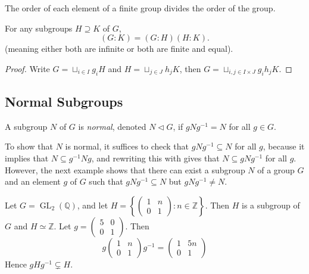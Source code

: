 \begin{corollary}
  \label{corollary-element-order-divide-group-order}
  The order of each element of a finite group divides the order of the group.
\end{corollary}

\begin{proposition}
  \label{proposition-generalization-Lagrange}
  For any subgroups \( H \supseteq K \) of \( G \), 
  \[
    (G: K) = (G: H)(H: K).
  \]
  (meaning either both are infinite or both are finite and equal).
\end{proposition}
\begin{proof}
  Write \( G = \sqcup_{i \in I} g_i H \) and \( H = \sqcup_{j \in J} h_jK \), then \( G = \sqcup_{i, j \in I \times J} g_i h_j K \).
\end{proof}

\subsection{Normal Subgroups}
\label{subsection-normal-subgroups}


\begin{definition}
  \label{definition-normal-subgroup}
  A subgroup \( N \) of \( G \) is \emph{normal}, denoted \( N \triangleleft G \), if \( gNg^{-1} = N \) for all \( g \in G \).
\end{definition}

\begin{remark}
  \label{remark-verify-subgroup-normal}
  To show that \( N \) is normal, it suffices to check that \( g N g^{-1} \subseteq N \) for all \( g \), because it implies that \( N \subseteq g^{-1} N g \), and rewriting this with gives that \( N \subseteq g N g^{-1} \) for all \( g \).
  However, the next example shows that there can exist a subgroup \( N \) of a group \( G \) and an element \( g \) of \( G \) such that \( g N g^{-1} \subseteq N \) but \( g N g^{-1} \neq N \).
\end{remark}

\begin{example}
  \label{example-conjugated-subgroup-contained-but-not-equal}
  Let \( G = \operatorname{GL}_2(\mathbb{Q}) \), and let \( H = \left\lbrace \begin{pmatrix}
      1 &n\\0 &1
  \end{pmatrix}: n \in \mathbb{Z} \right\rbrace \).
  Then \( H \) is a subgroup of \( G \) and \( H \simeq \mathbb{Z} \).
  Let \( g = \begin{pmatrix}
    5 & 0\\0 & 1
  \end{pmatrix} \).
  Then
  \[
    g \begin{pmatrix}
      1 &n \\0 &1
    \end{pmatrix} g^{-1} = \begin{pmatrix}
      1 &5n\\ 0 &1
    \end{pmatrix}
  \]
  Hence \( g H g^{-1} \subsetneq H \).
\end{example}

